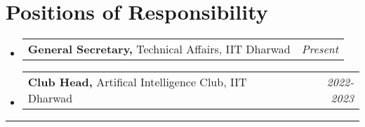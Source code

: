 \documentclass[a4paper,11pt]{article}
\makeatletter
\newcommand{\resumePOR}[3]{
\vspace{0.5mm}\item
    \begin{tabular*}{0.97\textwidth}[t]{l@{\extracolsep{\fill}}r}
        \textbf{#1}\hspace{0.3mm}#2 & \textit{\small{#3}} 
    \end{tabular*}
    \vspace{-2mm}
}
\newcommand{\resumeSubHeadingListStart}{\begin{itemize}[leftmargin=*,labelsep=0mm,label={}]}
\newcommand{\resumeSubHeadingListEnd}{\end{itemize}\vspace{2mm}}
\makeatother
\begin{document}
\section{Positions of Responsibility}
\vspace{-0.4mm}
\resumeSubHeadingListStart
\resumePOR{General Secretary, } %
    {Technical Affairs, IIT Dharwad} %
    {Present} %

\resumePOR{Club Head, } %
    {Artifical Intelligence Club, IIT Dharwad} %
    {2022-2023} %
\resumeSubHeadingListEnd
\vspace{-4mm}


\hspace*{-5mm}\rule{1.035\textwidth}{0.1mm}

\end{document}
